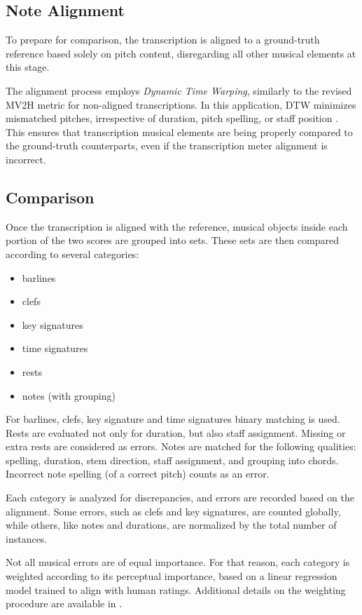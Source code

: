 \subsection{Note Alignment}

To prepare for comparison, the transcription is aligned to a ground-truth reference based solely on pitch content, disregarding all other musical elements at this stage.

The alignment process employs \emph{Dynamic Time Warping}, similarly to the revised MV2H metric for non-aligned transcriptions. In this application, DTW minimizes mismatched pitches, irrespective of duration, pitch spelling, or staff position \cite[p. 409]{Cogliati2016}. This ensures that transcription musical elements are being properly compared to the ground-truth counterparts, even if the transcription meter alignment is incorrect.

\subsection{Comparison}

Once the transcription is aligned with the reference, musical objects inside each portion of the two scores are grouped into sets. These sets are then compared according to several categories: \begin{itemize}
	\item barlines
	\item clefs
	\item key signatures
	\item time signatures
	\item rests
	\item notes (with grouping)
\end{itemize}

For barlines, clefs, key signature and time signatures binary matching is used. Rests are evaluated not only for duration, but also staff assignment. Missing or extra rests are considered as errors. Notes are matched for the following qualities: spelling, duration, stem direction, staff assignment, and grouping into chords. Incorrect note spelling (of a correct pitch) counts as an error.

Each category is analyzed for discrepancies, and errors are recorded based on the alignment. Some errors, such as clefs and key signatures, are counted globally, while others, like notes and durations, are normalized by the total number of instances.

Not all musical errors are of equal importance. For that reason, each category is weighted according to its perceptual importance, based on a linear regression model trained to align with human ratings. Additional details on the weighting procedure are available in \cite[p. 410--411]{Cogliati2017}.

